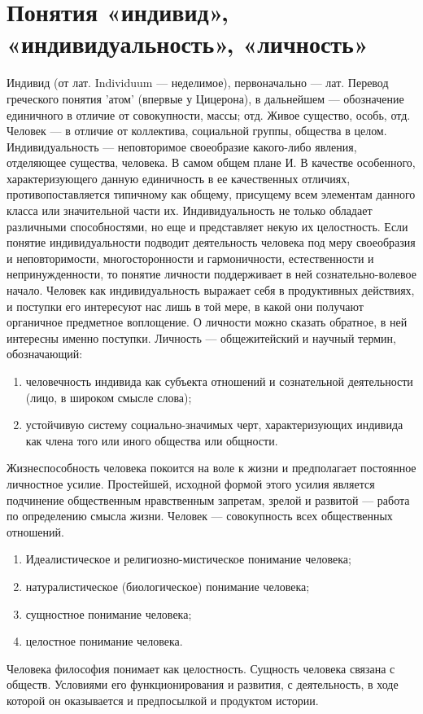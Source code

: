 \documentclass[12pt]{article}
\begin{document}
\section{Понятия «индивид», «индивидуальность», «личность»}
Индивид (от лат. Individuum --- неделимое), первоначально --- лат. Перевод греческого понятия 'атом' (впервые у
Цицерона), в дальнейшем --- обозначение единичного в отличие от совокупности, массы; отд. Живое существо,
особь, отд. Человек --- в отличие от коллектива, социальной группы, общества в целом.
Индивидуальность --- неповторимое своеобразие какого-либо явления, отделяющее существа, человека. В самом
общем плане И. В качестве особенного, характеризующего данную единичность в ее качественных отличиях,
противопоставляется типичному как общему, присущему всем элементам данного класса или значительной
части их.
Индивидуальность  не  только  обладает  различными  способностями,  но  еще  и  представляет  некую  их
целостность.  Если  понятие  индивидуальности  подводит  деятельность  человека  под  меру  своеобразия  и
неповторимости,  многосторонности  и  гармоничности,  естественности  и  непринужденности,  то  понятие
личности поддерживает в ней сознательно-волевое начало. Человек как индивидуальность выражает себя в
продуктивных действиях, и поступки его интересуют нас лишь в той мере, в какой они получают органичное
предметное воплощение. О личности можно сказать обратное, в ней интересны именно поступки.
Личность --- общежитейский и научный термин, обозначающий:
\begin{enumerate}
  \item человечность индивида как субъекта отношений и сознательной деятельности (лицо, в широком смысле
слова);
\item устойчивую систему социально-значимых черт, характеризующих индивида как члена того или иного
общества или общности. 
\end{enumerate}
Жизнеспособность  человека  покоится  на  воле  к  жизни  и  предполагает  постоянное  личностное  усилие.
Простейшей,  исходной  формой  этого  усилия  является  подчинение  общественным  нравственным  запретам,
зрелой и развитой --- работа по определению смысла жизни.
Человек --- совокупность всех общественных отношений.
\begin{enumerate}
  \item Идеалистическое и религиозно-мистическое понимание человека;
  \item натуралистическое (биологическое) понимание человека;
  \item сущностное понимание человека;
  \item целостное понимание человека. 
\end{enumerate}
Человека  философия  понимает  как  целостность.  Сущность  человека  связана  с  обществ.  Условиями  его
функционирования и развития, с деятельность, в ходе которой он оказывается и предпосылкой и продуктом
истории. 
\end{document}

